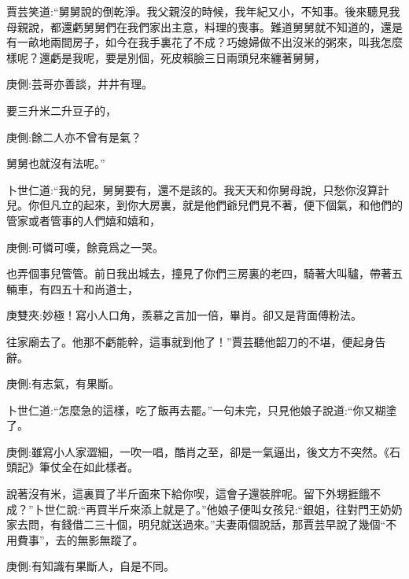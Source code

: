 \begin{parag}
    賈芸笑道:“舅舅說的倒乾淨。我父親沒的時候，我年紀又小，不知事。後來聽見我母親說，都還虧舅舅們在我們家出主意，料理的喪事。難道舅舅就不知道的，還是有一畝地兩間房子，如今在我手裏花了不成？巧媳婦做不出沒米的粥來，叫我怎麼樣呢？還虧是我呢，要是別個，死皮賴臉三日兩頭兒來纏著舅舅，\begin{note}庚側:芸哥亦善談，井井有理。\end{note}要三升米二升豆子的，\begin{note}庚側:餘二人亦不曾有是氣？\end{note}舅舅也就沒有法呢。”
\end{parag}


\begin{parag}
    卜世仁道:“我的兒，舅舅要有，還不是該的。我天天和你舅母說，只愁你沒算計兒。你但凡立的起來，到你大房裏，就是他們爺兒們見不著，便下個氣，和他們的管家或者管事的人們嬉和嬉和，\begin{note}庚側:可憐可嘆，餘竟爲之一哭。\end{note}也弄個事兒管管。前日我出城去，撞見了你們三房裏的老四，騎著大叫驢，帶著五輛車，有四五十和尚道士，\begin{note}庚雙夾:妙極！寫小人口角，羨慕之言加一倍，畢肖。卻又是背面傅粉法。\end{note}往家廟去了。他那不虧能幹，這事就到他了！”賈芸聽他韶刀的不堪，便起身告辭。\begin{note}庚側:有志氣，有果斷。\end{note}卜世仁道:“怎麼急的這樣，吃了飯再去罷。”一句未完，只見他娘子說道:“你又糊塗了。\begin{note}庚側:雖寫小人家澀細，一吹一唱，酷肖之至，卻是一氣逼出，後文方不突然。《石頭記》筆仗全在如此樣者。\end{note}說著沒有米，這裏買了半斤面來下給你喫，這會子還裝胖呢。留下外甥捱餓不成？”卜世仁說:“再買半斤來添上就是了。”他娘子便叫女孩兒:“銀姐，往對門王奶奶家去問，有錢借二三十個，明兒就送過來。”夫妻兩個說話，那賈芸早說了幾個“不用費事”，去的無影無蹤了。\begin{note}庚側:有知識有果斷人，自是不同。\end{note}
\end{parag}


